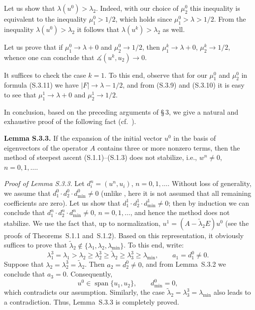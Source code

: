 \documentclass[11pt,oneside]{book}
\newcommand{\myspan}{\operatorname{span}}
\newcommand{\ang}{\measuredangle}
\begin{document}
Let us show that $\lambda(u^0) > \lambda_2$. Indeed, with our choice of $\mu_2^0$ this inequality is equivalent to the inequality $\mu_1^0 > 1/2$, which holds since $\mu_1^0 > \lambda > 1/2$. From the inequality $\lambda(u^0) > \lambda_2$ it follows that $\lambda(u^k) > \lambda_2$ as well.

Let us prove that if $\mu_1^0 \to \lambda + 0$ and $\mu_2^0 \to 1/2$, then $\mu_1^k \to \lambda + 0$, $\mu_2^k \to 1/2$, whence one can conclude that $\ang(u^k, u_2) \to 0$.

It suffices to check the case $k = 1$. To this end, observe that for our $\mu_1^0$ and $\mu_2^0$ in formula (S.3.11) we have $|F| \to \lambda - 1/2$, and from (S.3.9) and (S.3.10) it is easy to see that $\mu_1^1 \to \lambda + 0$ and $\mu_2^1 \to 1/2$.

In conclusion, based on the preceding arguments of \S\,3, %
we give a natural and exhaustive proof of the following fact (cf.~\citep{Zhuk1981}).

\textbf{Lemma S.3.3.} If the expansion of the initial vector $u^0$ in the basis of eigenvectors of the operator $A$ contains three or more nonzero terms, then the method of steepest ascent (S.1.1)--(S.1.3) does not stabilize, i.e., $w^n \neq 0$, $n = 0, 1, \ldots$. %

\textit{Proof of Lemma S.3.3.} Let $d_i^n = (u^n, u_i)$, $n = 0, 1, \ldots$. Without loss of generality, we assume that $d_1^0 \cdot d_2^0 \cdot d_{\min}^0 \neq 0$ (unlike \citep{Zhuk1981}, here it is not assumed that all remaining coefficients are zero). Let us show that $d_1^1 \cdot d_2^1 \cdot d_{\min}^1 \neq 0$; then by induction we can conclude that $d_1^n \cdot d_2^n \cdot d_{\min}^n \neq 0$, $n = 0, 1, \ldots$, and hence the method does not stabilize. We use the fact that, up to normalization, $u^1 = (A - \tilde{\lambda}_2 E) u^0$ (see the proofs of Theorems~S.1.1 and~S.1.2). Based on this representation, it obviously suffices to prove that $\tilde{\lambda}_2 \notin \{\lambda_1, \lambda_2, \lambda_{\min}\}$. To this end, write:
\[
\lambda_1^3 = \lambda_1 > \lambda_2 \geqslant \lambda_2^3 \geqslant \tilde{\lambda}_2 \geqslant \lambda_3^3 \geqslant \lambda_{\min}, \qquad a_1 = d_1^0 \neq 0.
\]
Suppose that $\lambda_2 = \lambda_2^3 = \tilde{\lambda}_2$. Then $a_2 = d_2^0 \neq 0$, and from Lemma~S.3.2 we conclude that $a_3 = 0$. Consequently,
\[
u^0 \in \myspan\{u_1, u_2\}, \qquad d_{\min}^0 = 0,
\]
which contradicts our assumption. Similarly, the case $\tilde{\lambda}_2 = \lambda_3^3 = \lambda_{\min}$ also leads to a contradiction. Thus, Lemma~S.3.3 is completely proved.
\end{document}
